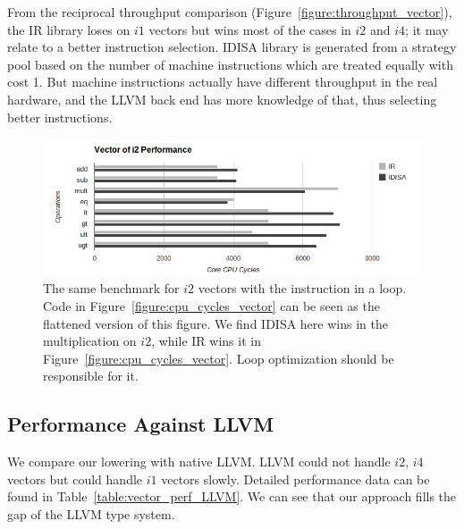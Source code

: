 From the reciprocal throughput comparison (Figure~\ref{figure:throughput_vector}), the IR library loses on $i1$ vectors but wins most of the cases in $i2$ and $i4$; it may relate to a better instruction selection. IDISA library is generated from a strategy pool based on the number of machine instructions which are treated equally with cost 1. But machine instructions actually have different throughput in the real hardware, and the LLVM back end has more knowledge of that, thus selecting better instructions.

\begin{figure}[htbp!]
\centering
\includegraphics[width=140mm]{draw/loop_vector_i2.png}
\caption[Vector of $i2$ tested in a loop]{The same benchmark for $i2$ vectors with the instruction in a loop. Code in Figure~\ref{figure:cpu_cycles_vector} can be seen as the flattened version of this figure. We find IDISA here wins in the multiplication on $i2$, while IR wins it in Figure~\ref{figure:cpu_cycles_vector}. Loop optimization should be responsible for it.}
\label{figure:loop_vector_i2}
\end{figure}

\subsection{Performance Against LLVM}
We compare our lowering with native LLVM\@. LLVM could not handle $i2$, $i4$ vectors but could handle $i1$ vectors slowly. Detailed performance data can be found in Table~\ref{table:vector_perf_LLVM}. We can see that our approach fills the gap of the LLVM type system.

